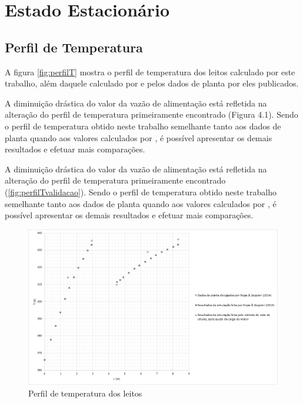 \section{Estado Estacionário} \label{sec:estadoestacionario}

\subsection{Perfil de Temperatura} \label{sec:perfildetemperatura}

A figura \autoref{fig:perfilT} mostra o perfil de temperatura dos leitos
calculado por este trabalho, além daquele calculado por 
e pelos dados de planta por eles publicados.  

A diminuição drástica do valor da vazão de alimentação está refletida na alteração
do perfil de temperatura primeiramente encontrado (Figura 4.1). Sendo o perfil
de temperatura obtido neste trabalho semelhante tanto aos dados de planta quando
aos valores calculados por , é
possível apresentar os demais resultados e efetuar mais comparações.

A diminuição drástica do valor da vazão de alimentação está refletida na alteração
do perfil de temperatura primeiramente encontrado
(\autoref{fig:perfilTvalidacao}). Sendo o perfil de temperatura obtido neste
trabalho semelhante tanto aos dados de planta quando aos valores calculados por
, é possível apresentar os demais resultados e efetuar
mais comparações.

\begin{figure}[htb]
\centering \includegraphics[scale=0.4]{images/Chap4/perfilT.png}
\caption{Perfil de temperatura dos leitos}
\label{fig:perfilT}
\end{figure}

